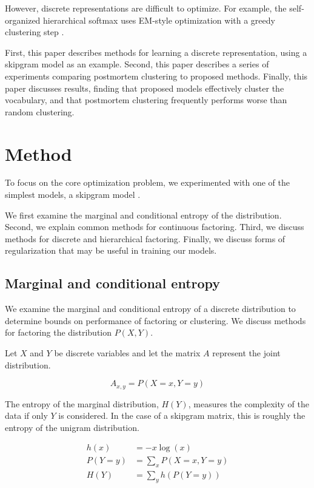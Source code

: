 \documentclass[11pt,letterpaper]{article}
\begin{document}
However, discrete representations are difficult to optimize. For example, the self-organized hierarchical softmax uses EM-style optimization with a greedy clustering step \cite{2017arXiv170708588S}.

First, this paper describes methods for learning a discrete representation, using a skipgram model as an example. Second, this paper describes a series of experiments comparing postmortem clustering to proposed methods. Finally, this paper discusses results, finding that proposed models effectively cluster the vocabulary, and that postmortem clustering frequently performs worse than random clustering.

\section{Method}

To focus on the core optimization problem, we experimented with one of the simplest models, a skipgram model \cite{Mikolov1301} \cite{MikolovSCCD13}.

We first examine the marginal and conditional entropy of the distribution. Second, we explain common methods for continuous factoring. Third, we discuss methods for discrete and hierarchical factoring. Finally, we discuss forms of regularization that may be useful in training our models.

\subsection{Marginal and conditional entropy}

We examine the marginal and conditional entropy of a discrete distribution to determine bounds on performance of factoring or clustering. We discuss methods for factoring the distribution $P(X,Y)$.

Let $X$ and $Y$ be discrete variables and let the matrix $A$ represent the joint distribution.

$$A_{x,y}=P(X=x, Y=y)$$

The entropy of the marginal distribution, $H(Y)$, measures the complexity of the data if only $Y$ is considered. In the case of a skipgram matrix, this is roughly the entropy of the unigram distribution.

\begin{align*}
h(x) &= -x \log(x) \\
P(Y=y) &= \sum_x P(X=x, Y=y) \\
H(Y) &=  \sum_y h(P(Y=y))
\end{align*}
\end{document}
